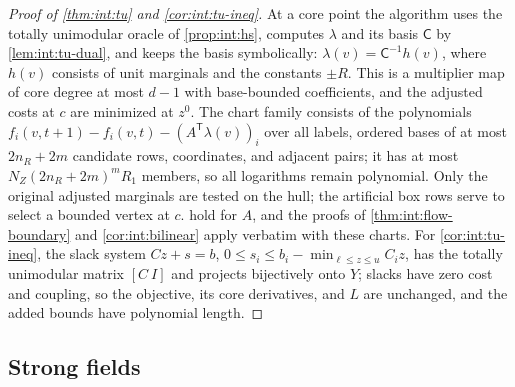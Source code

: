 \begin{proof}[Proof of \cref{thm:int:tu} and \cref{cor:int:tu-ineq}]
At a core point the algorithm uses the totally unimodular oracle of \cref{prop:int:hs},
computes $\lambda$ and its basis $\mathsf C$ by \cref{lem:int:tu-dual}, and keeps the basis
symbolically: $\lambda(v)=\mathsf C^{-1}h(v)$, where $h(v)$ consists of unit marginals and
the constants $\pm R$. This is a multiplier map of core degree at most $d-1$ with
base-bounded coefficients, and the adjusted costs at $c$ are minimized at $z^0$. The chart
family consists of the polynomials $f_i(v,t+1)-f_i(v,t)-(A^{\mathsf T}\lambda(v))_i$ over all
labels, ordered bases of at most $2n_R+2m$ candidate rows, coordinates, and adjacent
pairs; it has at most $N_Z(2n_R+2m)^mR_1$ members, so all logarithms remain polynomial.
Only the original adjusted marginals are tested on the hull; the artificial box rows
serve to select a bounded vertex at $c$. 
hold for $A$, and the proofs of \cref{thm:int:flow-boundary} and \cref{cor:int:bilinear}
apply verbatim with these charts. For \cref{cor:int:tu-ineq}, the slack system
$Cz+s=b$, $0\le s_i\le b_i-\min_{\ell\le z\le u}C_iz$, has the totally unimodular matrix
$[C\ I]$ and projects bijectively onto $Y$; slacks have zero cost and coupling, so the
objective, its core derivatives, and $L$ are unchanged, and the added bounds have
polynomial length.
\end{proof}

\subsection{Strong fields}\label{app:int:strong-field}

